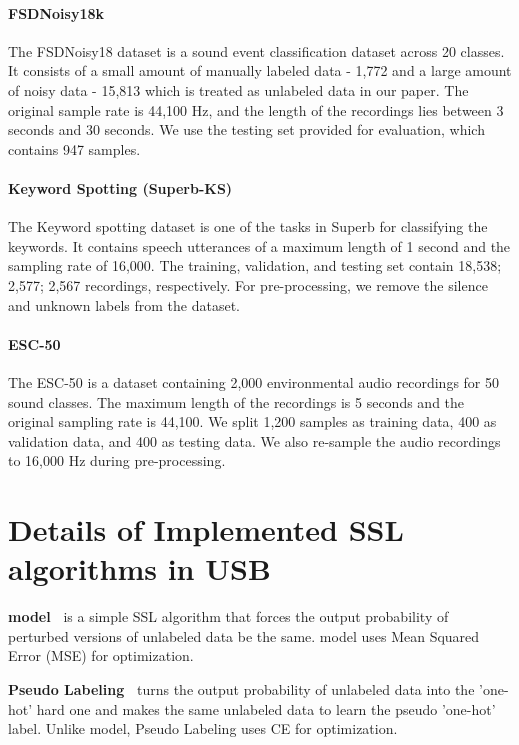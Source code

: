 \documentclass{article}
\begin{document}
\paragraph{FSDNoisy18k}
The FSDNoisy18 dataset \cite{fonseca2019learning} is a sound event classification dataset across 20 classes. It consists of a small amount of manually labeled data - 1,772 and a large amount of noisy data - 15,813 which is treated as unlabeled data in our paper. The original sample rate is 44,100 Hz, and the length of the recordings lies between 3 seconds and 30 seconds. We use the testing set provided for evaluation, which contains 947 samples.

\paragraph{Keyword Spotting (Superb-KS)} 
The Keyword spotting dataset is one of the tasks in Superb \cite{yang2021superb} for classifying the keywords. It contains speech utterances of a maximum length of 1 second and the sampling rate of 16,000. The training, validation, and testing set contain 18,538; 2,577; 2,567 recordings, respectively. For pre-processing, we remove the silence and unknown labels from the dataset. 

\paragraph{ESC-50} 
The ESC-50 \cite{piczak2015dataset} is a dataset containing 2,000 environmental audio recordings for 50 sound classes. The maximum length of the recordings is 5 seconds and the original sampling rate is 44,100. We split 1,200 samples as training data, 400 as validation data, and 400 as testing data. We also re-sample the audio recordings to 16,000 Hz during pre-processing.

\section{Details of Implemented SSL algorithms in USB}
\label{sec-detail-baseline}
\textbf{ model~\cite{rasmus2015semi}} is a simple SSL algorithm that forces the output probability of perturbed versions of unlabeled data be the same.  model uses Mean Squared Error (MSE) for optimization.

\textbf{Pseudo Labeling~\cite{lee2013pseudo}} turns the output probability of unlabeled data into the 'one-hot' hard one and makes the same unlabeled data to learn the pseudo 'one-hot' label. Unlike  model, Pseudo Labeling uses CE for optimization.
\end{document}
